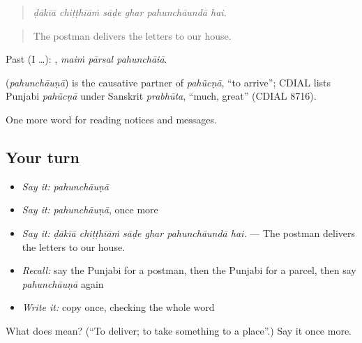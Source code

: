 \begin{quote}
     
\end{quote}

\begin{quote}
\emph{ḍākīā chiṭṭhīāṁ sāḍe ghar pahunchāundā hai.}
\end{quote}

\begin{quote}
The postman delivers the letters to our house.
\end{quote}

Past (I …):   , \emph{maiṁ pārsal pahunchāiā}.

\begin{cousinweb}
\textbf{} (\emph{pahunchāuṇā}) is the causative partner of \emph{pahũcṇā}, \textquotedblleft{}to arrive\textquotedblright{}; CDIAL lists Punjabi \emph{pahũcṇā} under Sanskrit \emph{prabhūta}, \textquotedblleft{}much, great\textquotedblright{} (CDIAL 8716).
\end{cousinweb}

\begin{grammarlens}[title={What you've built}]
One more word for reading notices and messages.
\end{grammarlens}

\subsection*{Your turn}
\begin{itemize}
\raggedright
  \item \emph{Say it:} \emph{pahunchāuṇā}
  \item \emph{Say it:} \emph{pahunchāuṇā}, once more
  \item \emph{Say it:} \emph{ḍākīā chiṭṭhīāṁ sāḍe ghar pahunchāundā hai.} — The postman delivers the letters to our house.
  \item \emph{Recall:} say the Punjabi for a postman, then the Punjabi for a parcel, then say \emph{pahunchāuṇā} again
  \item \emph{Write it:} copy \textbf{} once, checking the whole word
\end{itemize}

\begin{tcolorbox}[breakable,colback=teal!4,colframe=teal!35!black,title={Before you move on}]
What does  mean? (\textquotedblleft{}To deliver; to take something to a place\textquotedblright{}.) Say it once more.
\end{tcolorbox}
